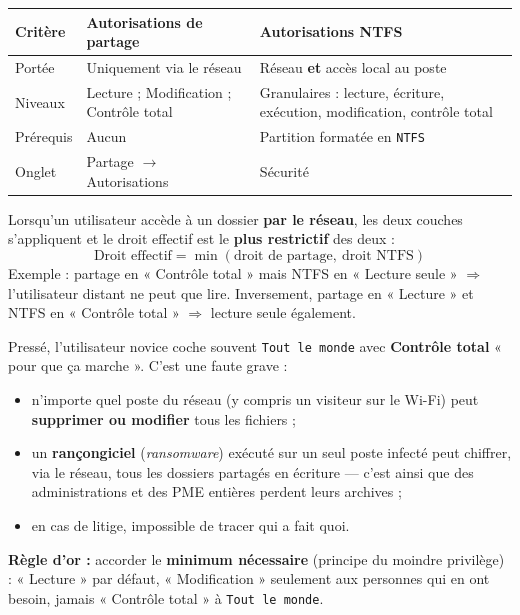 \documentclass[11pt]{article}
\begin{document}
\begin{center}
\begin{tabularx}{\linewidth}{|l|X|X|}
\hline
\rowcolor{popblueL} \textbf{Critère} & \textbf{Autorisations de partage} & \textbf{Autorisations NTFS} \\
\hline
Portée & Uniquement via le réseau & Réseau \textbf{et} accès local au poste \\
\hline
Niveaux & Lecture ; Modification ; Contrôle total & Granulaires : lecture, écriture, exécution, modification, contrôle total \\
\hline
Prérequis & Aucun & Partition formatée en \texttt{NTFS} \\
\hline
Onglet & Partage $\rightarrow$ Autorisations & Sécurité \\
\hline
\end{tabularx}
\end{center}

\begin{propriete}
Lorsqu'un utilisateur accède à un dossier \textbf{par le réseau}, les deux couches s'appliquent et le droit effectif est le \textbf{plus restrictif} des deux :
\[
\text{Droit effectif} = \min(\text{droit de partage},\ \text{droit NTFS})
\]
Exemple : partage en « Contrôle total » mais NTFS en « Lecture seule » $\Rightarrow$ l'utilisateur distant ne peut que lire. Inversement, partage en « Lecture » et NTFS en « Contrôle total » $\Rightarrow$ lecture seule également.
\end{propriete}

\begin{attention}
Pressé, l'utilisateur novice coche souvent \texttt{Tout le monde} avec \textbf{Contrôle total} « pour que ça marche ». C'est une faute grave :
\begin{itemize}
  \item n'importe quel poste du réseau (y compris un visiteur sur le Wi-Fi) peut \textbf{supprimer ou modifier} tous les fichiers ;
  \item un \textbf{rançongiciel} (\emph{ransomware}) exécuté sur un seul poste infecté peut chiffrer, via le réseau, tous les dossiers partagés en écriture — c'est ainsi que des administrations et des PME entières perdent leurs archives ;
  \item en cas de litige, impossible de tracer qui a fait quoi.
\end{itemize}
\textbf{Règle d'or :} accorder le \textbf{minimum nécessaire} (principe du moindre privilège) : « Lecture » par défaut, « Modification » seulement aux personnes qui en ont besoin, jamais « Contrôle total » à \texttt{Tout le monde}.
\end{attention}
\end{document}
